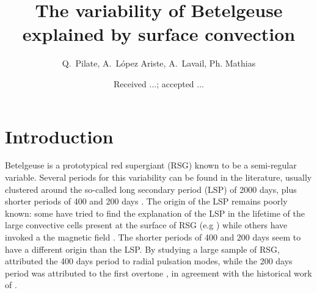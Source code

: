 \documentclass{aa}
\begin{document}
 


   \title{The variability  of Betelgeuse explained by surface convection}


    \author{{ Q.~Pilate},{ A.~L{\'o}pez Ariste},{ A.~Lavail},{ Ph. Mathias} }


   \date{Received ...; accepted ...}

 
  \abstract


   \keywords{
               }

   \maketitle
%

\section{Introduction}
Betelgeuse is a prototypical red supergiant (RSG) known to be a semi-regular variable. Several periods for this variability can be found in the 
literature, usually clustered around the so-called long secondary period (LSP) of 2000 days, plus shorter periods of 400 and 200 days \citep{kiss_variability_2006}. 
The origin of the LSP remains poorly known: some have tried to find the explanation of  the LSP in the lifetime of the large convective cells present at the surface of RSG (e.g \cite{stothers_giant_2010}) while others have invoked a the magnetic field \citep{wood_long_2004}. 
The shorter periods of 400 and 200 days seem to have a different origin than the LSP. By studying a large sample of 
RSG, \cite{kiss_variability_2006} attributed the 400 days period to radial pulsation modes, while the 200 days period was attributed to the first overtone \citep{joyce_standing_2020}, 
 in agreement with the historical work of \cite{stothers_pulsation_1969}.\\
\end{document}
